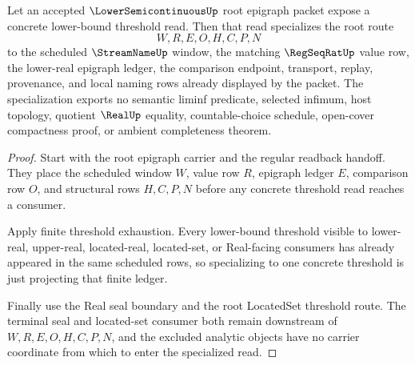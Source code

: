 \begin{theorem}
\label{thm:lower-semicontinuous-root-epigraph-specialization}
Let an accepted $\LowerSemicontinuousUp$ root epigraph packet expose a concrete lower-bound threshold read. Then that read specializes the root route
$$
W,R,E,O,H,C,P,N
$$
to the scheduled $\StreamNameUp$ window, the matching $\RegSeqRatUp$ value row, the lower-real epigraph ledger, the comparison endpoint, transport, replay, provenance, and local naming rows already displayed by the packet. The specialization exports no semantic liminf predicate, selected infimum, host topology, quotient $\RealUp$ equality, countable-choice schedule, open-cover compactness proof, or ambient completeness theorem.
\end{theorem}
\begin{proof}
Start with the root epigraph carrier and the regular readback handoff. They place the scheduled window $W$, value row $R$, epigraph ledger $E$, comparison row $O$, and structural rows $H,C,P,N$ before any concrete threshold read reaches a consumer.

Apply finite threshold exhaustion. Every lower-bound threshold visible to lower-real, upper-real, located-real, located-set, or Real-facing consumers has already appeared in the same scheduled rows, so specializing to one concrete threshold is just projecting that finite ledger.

Finally use the Real seal boundary and the root LocatedSet threshold route. The terminal seal and located-set consumer both remain downstream of $W,R,E,O,H,C,P,N$, and the excluded analytic objects have no carrier coordinate from which to enter the specialized read.
\end{proof}

